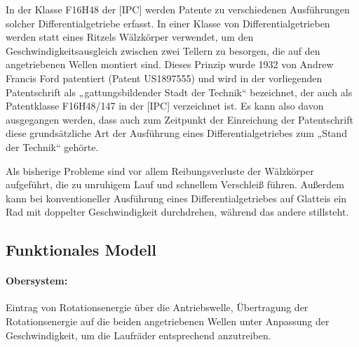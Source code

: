 \documentclass[11pt,a4paper]{article}
\begin{document}
In der Klasse F16H48 der [IPC] werden Patente zu verschiedenen Ausführungen
solcher Differentialgetriebe erfasst.  In einer Klasse von
Differentialgetrieben werden statt eines Ritzels Wälzkörper verwendet, um den
Geschwindigkeitsausgleich zwischen zwei Tellern zu besorgen, die auf den
angetriebenen Wellen montiert sind.  Dieses Prinzip wurde 1932 von Andrew
Francis Ford patentiert (Patent US1897555) und wird in der vorliegenden
Patentschrift als „gattungsbildender Stadt der Technik“ bezeichnet, der auch
als Patentklasse F16H48/147 in der [IPC] verzeichnet ist.  Es kann also davon
ausgegangen werden, dass auch zum Zeitpunkt der Einreichung der Patentschrift
diese grundsätzliche Art der Ausführung eines Differentialgetriebes zum „Stand
der Technik“ gehörte.

Als bisherige Probleme sind vor allem Reibungsverluste der Wälzkörper
aufgeführt, die zu unruhigem Lauf und schnellem Verschleiß führen.  Außerdem
kann bei konventioneller Ausfüh\-rung eines Differentialgetriebes auf Glatteis
ein Rad mit doppelter Geschwindigkeit durchdrehen, während das andere
stillsteht.

\subsection{Funktionales Modell}

\paragraph{Obersystem:}
Eintrag von Rotationsenergie über die Antriebswelle, Übertragung der
Rotationsenergie auf die beiden angetriebenen Wellen unter Anpassung der
Geschwindigkeit, um die Laufräder entsprechend anzutreiben. 
\end{document}
